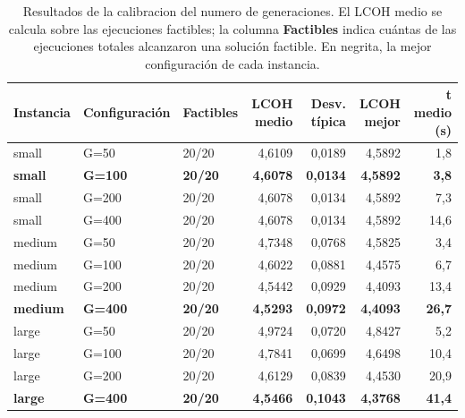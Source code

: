 \begin{table}[H]
    \centering
    \small
    \renewcommand{\arraystretch}{1.25}
    \begin{tabular}{lllrrrr}
        \hline
        \textbf{Instancia} & \textbf{Configuración} & \textbf{Factibles} & \textbf{LCOH medio} & \textbf{Desv. típica} & \textbf{LCOH mejor} & \textbf{t medio (s)} \\
        \hline
        small & G=50 & 20/20 & 4,6109 & 0,0189 & 4,5892 & 1,8 \\
        \textbf{small} & \textbf{G=100} & \textbf{20/20} & \textbf{4,6078} & \textbf{0,0134} & \textbf{4,5892} & \textbf{3,8} \\
        small & G=200 & 20/20 & 4,6078 & 0,0134 & 4,5892 & 7,3 \\
        small & G=400 & 20/20 & 4,6078 & 0,0134 & 4,5892 & 14,6 \\
        \hline
        medium & G=50 & 20/20 & 4,7348 & 0,0768 & 4,5825 & 3,4 \\
        medium & G=100 & 20/20 & 4,6022 & 0,0881 & 4,4575 & 6,7 \\
        medium & G=200 & 20/20 & 4,5442 & 0,0929 & 4,4093 & 13,4 \\
        \textbf{medium} & \textbf{G=400} & \textbf{20/20} & \textbf{4,5293} & \textbf{0,0972} & \textbf{4,4093} & \textbf{26,7} \\
        \hline
        large & G=50 & 20/20 & 4,9724 & 0,0720 & 4,8427 & 5,2 \\
        large & G=100 & 20/20 & 4,7841 & 0,0699 & 4,6498 & 10,4 \\
        large & G=200 & 20/20 & 4,6129 & 0,0839 & 4,4530 & 20,9 \\
        \textbf{large} & \textbf{G=400} & \textbf{20/20} & \textbf{4,5466} & \textbf{0,1043} & \textbf{4,3768} & \textbf{41,4} \\
        \hline
    \end{tabular}
    \caption{Resultados de la calibracion del numero de generaciones. El LCOH medio se calcula sobre las ejecuciones factibles; la columna \textbf{Factibles} indica cuántas de las ejecuciones totales alcanzaron una solución factible. En negrita, la mejor configuración de cada instancia.}
    \label{tab:calib_e05_g}
\end{table}
